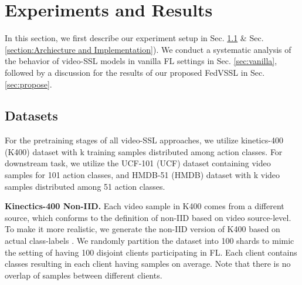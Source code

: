 \section{Experiments and Results}
In this section, we first describe our experiment setup in Sec. \ref{Dataset_decp} \& Sec. \ref{section:Archiecture and Implementation}). We conduct a systematic analysis of the behavior of video-SSL models in vanilla FL settings in Sec. \ref{sec:vanilla}, followed by a discussion for the results of our proposed FedVSSL in Sec. \ref{sec:propose}.

\subsection{Datasets}
\label{Dataset_decp}
For the pretraining stages of all video-SSL approaches, we utilize kinetics-400 (K400) dataset \cite{kay2017kinetics} with k training samples distributed among  action classes. For downstream task, we utilize the UCF-101 \cite{soomro2012ucf101} (UCF) dataset containing  video samples for 101 action classes, and HMDB-51 \cite{Kuehne11} (HMDB) dataset with k video samples distributed among 51 action classes.

\noindent\textbf{Kinectics-400 Non-IID.} Each video sample in K400 comes from a different source, which conforms to the definition of non-IID based on video source-level. To make it more realistic, we generate the non-IID version of K400 based on actual class-labels \cite{mcmahan2017communication}. 
We randomly partition the dataset into 100 shards to mimic the setting of having 100 disjoint clients participating in FL. Each client contains  classes resulting in each client having  samples on average. Note that there is no overlap of samples between different clients. 


